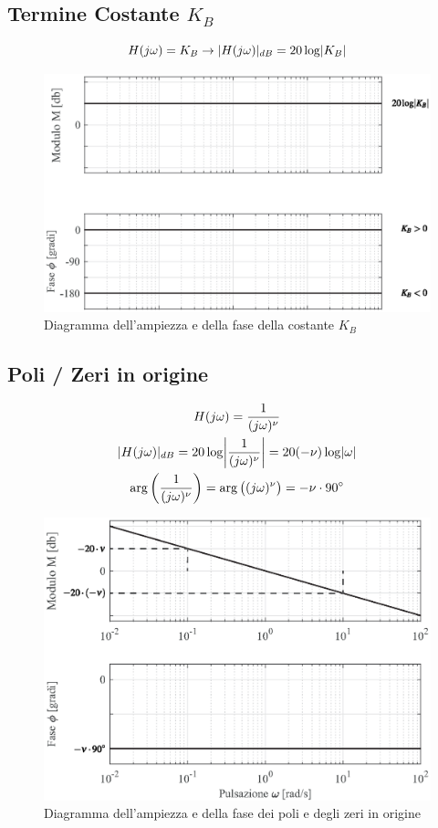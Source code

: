 \subsection{Termine Costante $ K_B $} 
\[ H(j\omega) = K_B \rightarrow \lvert H(j\omega)\rvert_{dB} = 20 \log \lvert K_B\rvert \]
\begin{figure}[H]
	\centering
	\includegraphics[width=0.8\linewidth]{immagini/cap6_Bode/bodeCost.eps}
	\caption{ Diagramma dell'ampiezza e della fase della costante $  K_B $ }
	\label{fig:bodeCost}
\end{figure}

\subsection{Poli / Zeri in origine}

\begin{gather*}
	H(j\omega) = \frac{1}{(j\omega)^\nu}\\
	\abs{H(j\omega)}_{dB} = 20 \log \Abs{\frac{1}{(j\omega)^\nu}} = 20 ( -\nu) \log \abs{\omega} \\
	\arg \bigg(\frac{1}{(j\omega)^\nu}\bigg) = \arg \big((j\omega)^{\nu}\big) = -\nu \cdot \ang{90} 
\end{gather*}

\begin{figure}[H]
	\centering
	\includegraphics[width=0.8\linewidth]{immagini/cap6_Bode/bodeZPOrig.eps}
	\caption{ Diagramma dell'ampiezza e della fase dei poli e degli zeri in origine}
	\label{fig:bodeZPOrig}
\end{figure}

